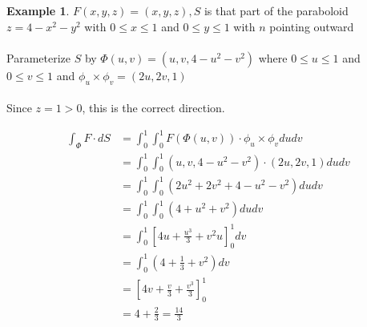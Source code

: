 \documentclass[12pt]{article}
\theoremstyle{plain}
\theoremstyle{definition}
\newtheorem{example}[theorem]{Example}
\begin{document}
\begin{example}
	$F(x,y,z) = (x,y,z), S$ is that part of the paraboloid $z=4-x^2-y^2$ with $0 \leq x \leq 1$ and $0 \leq y \leq 1$ with $n$ pointing outward\\
	\\
	Parameterize $S$ by $\Phi (u,v) = (u,v, 4-u^2-v^2)$ where $0 \leq u \leq 1$ and $0 \leq v \leq 1$ and $\phi_u \times \phi_v = (2u, 2v, 1)$\\
	\\
	Since $z=1 > 0$, this is the correct direction.
	
	\begin{align*}
		\int_\Phi F \cdot dS &= \int_0^1 \int_0^1 F(\Phi (u,v)) \cdot \phi_u \times \phi_v dudv\\
		&= \int_0^1 \int_0^1 (u,v,4-u^2-v^2) \cdot (2u, 2v, 1) dudv\\
		&= \int_0^1 \int_0^1 (2u^2 + 2v^2 + 4-u^2-v^2)dudv\\
		&= \int_0^1 \int_0^1 (4+u^2+v^2) dudv\\
		&= \int_0^1 [4u+ \frac{u^3}{3} + v^2 u]^1_0 dv\\
		&= \int_0^1 (4+\frac{1}{3} + v^2)dv\\
		&=[4v + \frac{v}{3} + \frac{v^3}{3}]_0^1\\
		&= 4 + \frac{2}{3} = \frac{14}{3}
	\end{align*}

\end{example}
\end{document}

